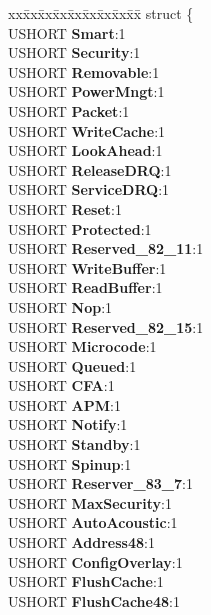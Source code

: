 \begin{DoxyCompactItemize}
\begin{tabbing}
\end{tabbing}\item 
\mbox{\label{struct___i_d_e_n_t_i_f_y___d_a_t_a_a20d298440fc5b4626642174b9ac64ae1}} 
\begin{tabbing}
xx\=xx\=xx\=xx\=xx\=xx\=xx\=xx\=xx\=\kill
struct \{\\
\>USHORT {\bfseries Smart}:1\\
\>USHORT {\bfseries Security}:1\\
\>USHORT {\bfseries Removable}:1\\
\>USHORT {\bfseries PowerMngt}:1\\
\>USHORT {\bfseries Packet}:1\\
\>USHORT {\bfseries WriteCache}:1\\
\>USHORT {\bfseries LookAhead}:1\\
\>USHORT {\bfseries ReleaseDRQ}:1\\
\>USHORT {\bfseries ServiceDRQ}:1\\
\>USHORT {\bfseries Reset}:1\\
\>USHORT {\bfseries Protected}:1\\
\>USHORT {\bfseries Reserved\_82\_11}:1\\
\>USHORT {\bfseries WriteBuffer}:1\\
\>USHORT {\bfseries ReadBuffer}:1\\
\>USHORT {\bfseries Nop}:1\\
\>USHORT {\bfseries Reserved\_82\_15}:1\\
\>USHORT {\bfseries Microcode}:1\\
\>USHORT {\bfseries Queued}:1\\
\>USHORT {\bfseries CFA}:1\\
\>USHORT {\bfseries APM}:1\\
\>USHORT {\bfseries Notify}:1\\
\>USHORT {\bfseries Standby}:1\\
\>USHORT {\bfseries Spinup}:1\\
\>USHORT {\bfseries Reserver\_83\_7}:1\\
\>USHORT {\bfseries MaxSecurity}:1\\
\>USHORT {\bfseries AutoAcoustic}:1\\
\>USHORT {\bfseries Address48}:1\\
\>USHORT {\bfseries ConfigOverlay}:1\\
\>USHORT {\bfseries FlushCache}:1\\
\>USHORT {\bfseries FlushCache48}:1\\

\end{tabbing}
\end{DoxyCompactItemize}
